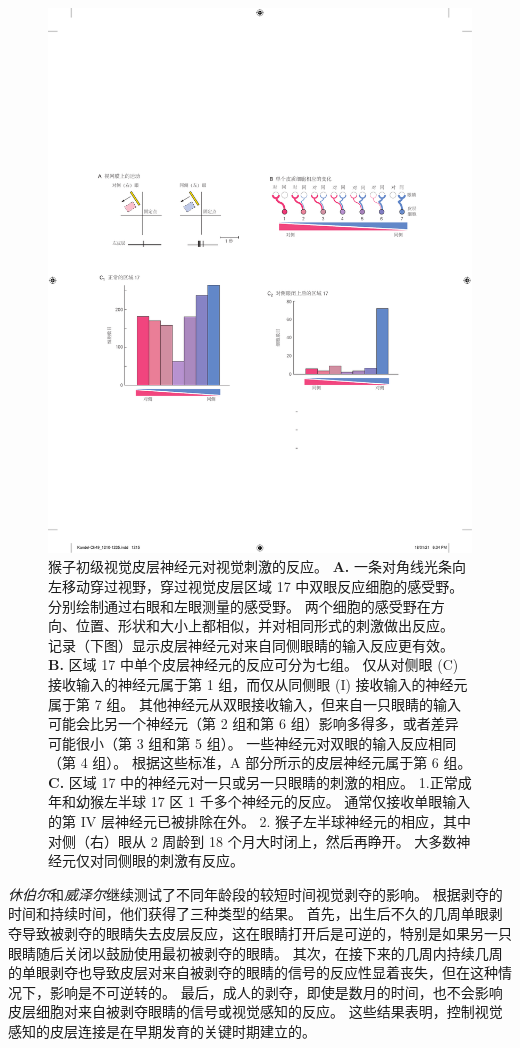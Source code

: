 \begin{figure}[htbp]
	\centering
	\includegraphics[width=0.5\linewidth]{chap49/fig_49_3}
	\caption{猴子初级视觉皮层神经元对视觉刺激的反应\cite{hubel1977ferrier}。
		\textbf{A.} 一条对角线光条向左移动穿过视野，穿过视觉皮层区域 17 中双眼反应细胞的感受野。
		分别绘制通过右眼和左眼测量的感受野。
		两个细胞的感受野在方向、位置、形状和大小上都相似，并对相同形式的刺激做出反应。
		记录（下图）显示皮层神经元对来自同侧眼睛的输入反应更有效。
		\textbf{B.} 区域 17 中单个皮层神经元的反应可分为七组。
		仅从对侧眼 (C) 接收输入的神经元属于第 1 组，而仅从同侧眼 (I) 接收输入的神经元属于第 7 组。
		其他神经元从双眼接收输入，但来自一只眼睛的输入可能会比另一个神经元（第 2 组和第 6 组）影响多得多，或者差异可能很小（第 3 组和第 5 组）。
		一些神经元对双眼的输入反应相同（第 4 组）。
		根据这些标准，A 部分所示的皮层神经元属于第 6 组。
		\textbf{C.} 区域 17 中的神经元对一只或另一只眼睛的刺激的相应。
		1.正常成年和幼猴左半球 17 区 1 千多个神经元的反应。
		通常仅接收单眼输入的第 IV 层神经元已被排除在外。
		2. 猴子左半球神经元的相应，其中对侧（右）眼从 2 周龄到 18 个月大时闭上，然后再睁开。
		大多数神经元仅对同侧眼的刺激有反应。}
	\label{fig:49_3}
\end{figure}


\textit{休伯尔}和\textit{威泽尔}继续测试了不同年龄段的较短时间视觉剥夺的影响。
根据剥夺的时间和持续时间，他们获得了三种类型的结果。
首先，出生后不久的几周单眼剥夺导致被剥夺的眼睛失去皮层反应，这在眼睛打开后是可逆的，特别是如果另一只眼睛随后关闭以鼓励使用最初被剥夺的眼睛。
其次，在接下来的几周内持续几周的单眼剥夺也导致皮层对来自被剥夺的眼睛的信号的反应性显着丧失，但在这种情况下，影响是不可逆转的。
最后，成人的剥夺，即使是数月的时间，也不会影响皮层细胞对来自被剥夺眼睛的信号或视觉感知的反应。
这些结果表明，控制视觉感知的皮层连接是在早期发育的关键时期建立的。


